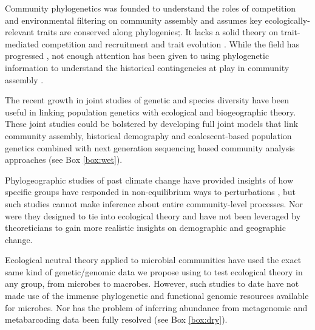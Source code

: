 \documentclass[12pt]{article}
\newcounter{Box}
\providecommand{\DIFdeltex}[1]{{\protect\color{red}\sout{#1}}}                      %
\providecommand{\DIFdelbegin}{} %
\providecommand{\DIFdelend}{} %
\providecommand{\DIFdel}[1]{\texorpdfstring{\DIFdeltex{#1}}{}} %
\begin{document}
Community phylogenetics \citep{Webb2002-yr} was founded to understand
the roles of competition and environmental filtering on community
assembly and  assumes key ecologically-relevant traits are conserved
along phylogenies\DIFdelbegin \DIFdel{;}\DIFdelend . It lacks a solid theory on trait-mediated
competition and recruitment and trait evolution \citep{Losos2008-eq}. While the field has
progressed \citep[e.g.,][]{sukumaran2016}, not enough attention has been
given to using phylogenetic information to understand the historical
contingencies at play in community assembly \citep{Ricklefs2007-wo,
  Emerson2008-as}.

The recent growth in joint studies of genetic and species diversity
\citep{Vanoverbeke2015-ym, Vellend2005-up, Vellend2014-ir,
  Papadopoulou2011-bd} have been useful in linking population genetics
with ecological and biogeographic theory. These joint studies could be bolstered by
developing full joint models that link community assembly, historical
demography and coalescent-based population genetics combined with
next generation sequencing based community analysis approaches (see
Box \ref{box:wet}).

Phylogeographic studies of past climate change have provided insights
% 
% 
% 
of how specific groups have responded in non-equilibrium ways to
perturbations \citep{Arbogast2001-jx, Smith2012-db, Hickerson2005-ek,
  Satler2016-lb}, but such studies cannot make inference about entire
community-level processes. Nor were they designed to tie into
ecological theory and have not been leveraged by theoreticians to gain
more realistic insights on demographic and geographic change.

Ecological neutral theory applied to microbial communities
\citep{Venkataraman2015-rk} have used the exact same kind of
genetic/genomic data we propose using to test ecological theory
in any group, from microbes to macrobes. However, such studies to date
have not made use of the immense phylogenetic and functional genomic
resources available for microbes. Nor has the problem of inferring
abundance from metagenomic and metabarcoding data been fully resolved
(see Box \ref{box:dry}).
\end{document}
